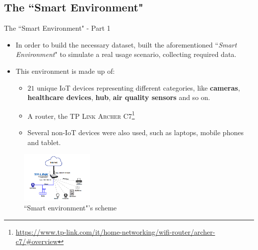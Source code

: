 \documentclass[10pt]{beamer}
\begin{document}
\subsection{The ``Smart Environment"}
\begin{frame}{The ``Smart Environment" - Part 1}

\begin{itemize}
\justifying
\item In order to build the necessary dataset, \citet{ITPAReport} built the aforementioned ``\textit{Smart Environment}" to simulate a real usage scenario, collecting required data.

\item This environment is made up of:

\begin{itemize}
\justifying
\item $21$ unique IoT devices representing different categories, like \textbf{cameras}, \textbf{healthcare devices}, \textbf{hub}, \textbf{air quality sensors} and so on.

\item A router, the \textsc{TP Link Archer C7}\footnote{\tiny\url{https://www.tp-link.com/it/home-networking/wifi-router/archer-c7/\#overview}}

\item Several non-IoT devices were also used, such as laptops, mobile phones and tablet.

\end{itemize}
\end{itemize}

\begin{figure}
  \caption{``Smart environment"'s scheme}
  \includegraphics[width=100pt]{Topology.png}
\end{figure}

\end{frame} 
\end{document}
